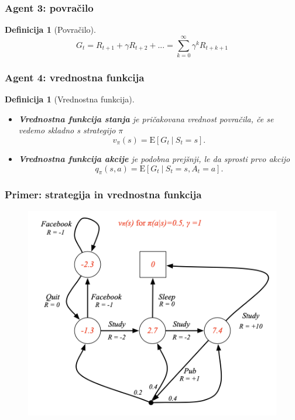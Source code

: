 \documentclass{beamer}    %
\newtheorem{definicija}[izrek]{Definicija}
\begin{document}
\begin{frame}
    \frametitle{Agent 3: povračilo}
    \begin{definicija}[Povračilo]
        $$
        G_t = R_{t+1} + \gamma R_{t+2} + ... = \sum_{k=0}^\infty \gamma^k R_{t + k + 1}
        $$
    \end{definicija}
\end{frame}


\begin{frame}
    \frametitle{Agent 4: vrednostna funkcija}
    \begin{definicija}[Vrednostna funkcija]
        \begin{itemize}
            \item \textbf{Vrednostna funkcija stanja} je pričakovana vrednost povračila, če se 
                    vedemo skladno s strategijo $\pi$ 
                    $$
                    v_\pi(s) = \mathrm{E} [G_t~|~S_t = s].
                    $$
            \item \textbf{Vrednostna funkcija akcije} je podobna prejšnji, le da sprosti prvo akcijo 
                    $$
                    q_\pi(s, a) = \mathrm{E} [G_t~|~S_t = s, A_t = a].
                    $$
        \end{itemize}
    \end{definicija}
\end{frame}


\begin{frame}
    \frametitle{Primer: strategija in vrednostna funkcija}
    \begin{figure}[b]
        \includegraphics[scale=0.6]{slike/strat-vrednost.png}
    \end{figure}
\end{frame}
\end{document}
